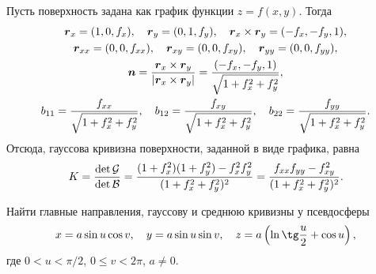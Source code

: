 \begin{example}
	Пусть поверхность задана как график функции $z = f(x, y)$. Тогда
	\begin{gather*}
		\boldsymbol{r}_x = (1, 0, f_x),\quad \boldsymbol{r}_{y} = (0, 1, f_y),\quad \boldsymbol{r}_x \times \boldsymbol{r}_y = (-f_x, -f_y, 1),\\
		\boldsymbol{r}_{xx} = (0, 0, f_{xx}),\quad \boldsymbol{r}_{xy} = (0, 0, f_{xy}),\quad \boldsymbol{r}_{yy} = (0, 0, f_{yy}),\\
		\boldsymbol{n} = \frac{\boldsymbol{r}_x \times \boldsymbol{r}_y}{\left\lvert\boldsymbol{r}_x \times \boldsymbol{r}_y\right\rvert} = \frac{(-f_x, -f_y, 1)}{\sqrt{1 + f_x^2 + f_y^2}},\\
		b_{11} = \frac{f_{xx}}{\sqrt{1 + f_x^2 + f_y^2}},\quad b_{12} = \frac{f_{xy}}{\sqrt{1 + f_x^2 + f_y^2}},\quad b_{22} = \frac{f_{yy}}{\sqrt{1 + f_x^2 + f_y^2}}.
	\end{gather*}
	Отсюда, гауссова кривизна поверхности, заданной в виде графика, равна
	\[
		K = \frac{\det\mathcal{G}}{\det\mathcal{B}} = \frac{(1 + f_x^2)(1 + f_y^2) - f_x^2f_y^2}{(1 + f_x^2 + f_y^2)^2} = \frac{f_{xx}f_{yy} - f_{xy}^2}{(1 + f_x^2 + f_y^2)^2}.
	\]
\end{example}

\begin{problem}
	Найти главные направления, гауссову и среднюю кривизны у псевдосферы
	\[
		x = a\sin u\cos v,\quad y = a\sin u\sin v,\quad z = a\br{\ln\tg\frac{u}{2} + \cos u},
	\]
	где $0 < u < \pi / 2$, $0 \leqslant v < 2\pi$, $a \ne 0$.
\end{problem}

